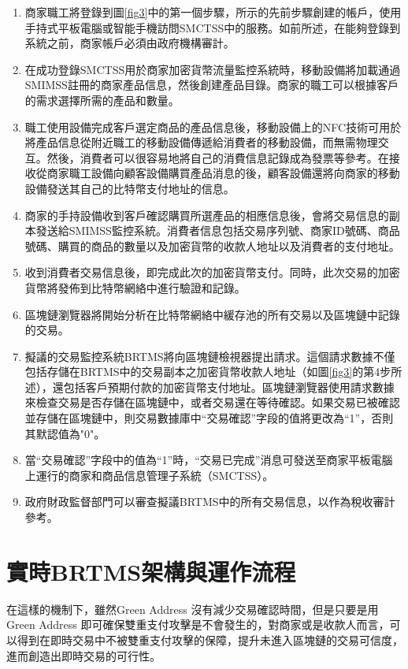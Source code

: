 		\begin{enumerate}
			\item 商家職工將登錄到圖\ref{fig3}中的第一個步驟，所示的先前步驟創建的帳戶，使用手持式平板電腦或智能手機訪問SMCTSS中的服務。如前所述，在能夠登錄到系統之前，商家帳戶必須由政府機構審計。
			\item 在成功登錄SMCTSS用於商家加密貨幣流量監控系統時，移動設備將加載通過SMIMSS註冊的商家產品信息，然後創建產品目錄。商家的職工可以根據客戶的需求選擇所需的產品和數量。

			\item 職工使用設備完成客戶選定商品的產品信息後，移動設備上的NFC技術可用於將產品信息從附近職工的移動設備傳遞給消費者的移動設備，而無需物理交互。然後，消費者可以很容易地將自己的消費信息記錄成為發票等參考。在接收從商家職工設備向顧客設備購買產品消息的後，顧客設備還將向商家的移動設備發送其自己的比特幣支付地址的信息。
			\item 商家的手持設備收到客戶確認購買所選產品的相應信息後，會將交易信息的副本發送給SMIMSS監控系統。消費者信息包括交易序列號、商家ID號碼、商品號碼、購買的商品的數量以及加密貨幣的收款人地址以及消費者的支付地址。
			\item 收到消費者交易信息後，即完成此次的加密貨幣支付。同時，此次交易的加密貨幣將發佈到比特幣網絡中進行驗證和記錄。
			\item 區塊鏈瀏覽器將開始分析在比特幣網絡中緩存池的所有交易以及區塊鏈中記錄的交易。
			\item 擬議的交易監控系統BRTMS將向區塊鏈檢視器提出請求。這個請求數據不僅包括存儲在BRTMS中的交易副本之加密貨幣收款人地址（如圖\ref{fig3}的第4步所述），還包括客戶預期付款的加密貨幣支付地址。區塊鏈瀏覽器使用請求數據來檢查交易是否存儲在區塊鏈中，或者交易還在等待確認。如果交易已被確認並存儲在區塊鏈中，則交易數據庫中“交易確認”字段的值將更改為“1”，否則其默認值為"0"。
			\item 當“交易確認”字段中的值為“1”時，“交易已完成”消息可發送至商家平板電腦上運行的商家和商品信息管理子系統（SMCTSS）。
			\item 政府財政監督部門可以審查擬議BRTMS中的所有交易信息，以作為稅收審計參考。
		\end{enumerate}

\section{實時BRTMS架構與運作流程}

		在這樣的機制下，雖然Green Address 沒有減少交易確認時間，但是只要是用Green Address 即可確保雙重支付攻擊是不會發生的，對商家或是收款人而言，可以得到在即時交易中不被雙重支付攻擊的保障，提升未進入區塊鏈的交易可信度，進而創造出即時交易的可行性。 

